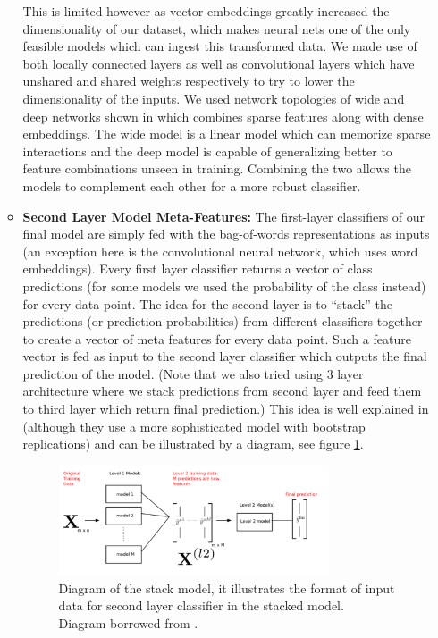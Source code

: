 \begin{itemize}
\begin{itemize}
        This is limited however as vector embeddings greatly increased the dimensionality of our dataset, which makes neural nets one of the only feasible models which can ingest this transformed data. We made use of both locally connected layers as well as convolutional layers which have unshared and shared weights respectively to try to lower the dimensionality of the inputs. We used network topologies of wide and deep networks shown in \cite{cheng2016wide} which combines sparse features along with dense embeddings. The wide model is a linear model which can memorize sparse interactions and the deep model is capable of generalizing better to feature combinations unseen in training. Combining the two allows the models to complement each other for a more robust classifier.
        \item \textbf{Second Layer Model Meta-Features:} The first-layer classifiers of our final model are simply fed with the bag-of-words representations as inputs (an exception here is the convolutional neural network, which uses word embeddings). Every first layer classifier returns a vector of class predictions (for some models we used the probability of the class instead) for every data point. The idea for the second layer is to ``stack'' the predictions (or prediction probabilities) from different classifiers together to create a vector of meta features for every data point. Such a feature vector is fed as input to the second layer classifier which outputs the final prediction of the model. (Note that we also tried using 3 layer architecture where we stack predictions from second layer and feed them to third layer which return final prediction.) This idea is well explained in \cite{gunes2017stacking} (although they use a more sophisticated model with bootstrap replications) and can be illustrated by a diagram, see figure \ref{stack}.
        \begin{figure}[H]
        \centering
        \includegraphics[width=0.8\textwidth]{stack_model}
        \caption{Diagram of the stack model, it illustrates the format of input data for second layer classifier in the stacked model. Diagram borrowed from \cite{stack2017}.}
        \label{stack}
        \end{figure}
    \end{itemize}


\end{itemize}
